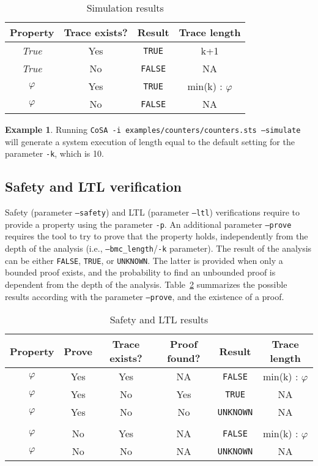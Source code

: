 \documentclass{article}
\theoremstyle{definition}
\newtheorem{example}{Example}[section]
\begin{document}
\begin{table}[h]
  \centering
\begin{tabular}{ c c | c c }
  Property & Trace exists? & Result & Trace length \\ \hline 
  \emph{True} & Yes & \texttt{TRUE} & k+1  \\
  \emph{True} & No & \texttt{FALSE} & NA  \\
  $\varphi$ & Yes & \texttt{TRUE} & min(k) : $\varphi$  \\
  $\varphi$ & No & \texttt{FALSE} & NA  \\
\end{tabular}
\label{tab:simulation_results}
\caption{Simulation results}
\end{table}

\begin{example}
  Running \texttt{CoSA -i examples/counters/counters.sts --simulate}
  will generate a system execution of length equal to the default
  setting for the parameter \texttt{-k}, which is 10.
\end{example}

\subsection{Safety and LTL verification}

Safety (parameter \texttt{--safety}) and LTL (parameter
\texttt{--ltl}) verifications require to provide a property using the
parameter \texttt{-p}. An additional parameter \texttt{--prove}
requires the tool to try to prove that the property holds,
independently from the depth of the analysis (i.e.,
\texttt{--bmc\_length}/\texttt{-k} parameter). The result of the
analysis can be either \texttt{FALSE}, \texttt{TRUE}, or
\texttt{UNKNOWN}. The latter is provided when only a bounded proof
exists, and the probability to find an unbounded proof is dependent
from the depth of the analysis. Table~\ref{tab:safety_results}
summarizes the possible results according with the parameter
\texttt{--prove}, and the existence of a proof.

\begin{table}[h]
  \centering
\begin{tabular}{ c c c c | c c }
  Property & Prove & Trace exists? & Proof found? & Result & Trace length \\ \hline
  $\varphi$ & Yes & Yes & NA & \texttt{FALSE} & min(k) : $\varphi$  \\
  $\varphi$ & Yes & No & Yes & \texttt{TRUE} & NA  \\
  $\varphi$ & Yes & No & No & \texttt{UNKNOWN} & NA  \\ \\
  $\varphi$ & No & Yes & NA & \texttt{FALSE} & min(k) : $\varphi$  \\
  $\varphi$ & No & No & NA & \texttt{UNKNOWN} & NA  \\
\end{tabular}
\label{tab:safety_results}
\caption{Safety and LTL results}
\end{table}
\end{document}
